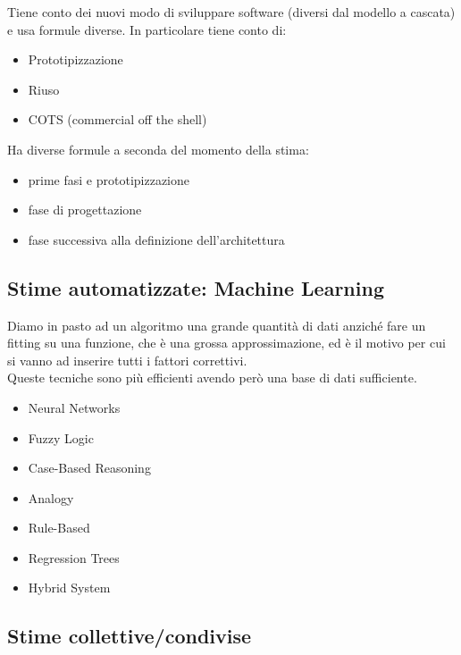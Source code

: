 Tiene conto dei nuovi modo di sviluppare software (diversi dal modello a cascata) e usa formule diverse. In particolare tiene conto di:
\begin{itemize}
    \item Prototipizzazione
    \item Riuso
    \item COTS (commercial off the shell)
\end{itemize}
Ha diverse formule a seconda del momento della stima:
\begin{itemize}
    \item prime fasi e prototipizzazione
    \item fase di progettazione
    \item fase successiva alla definizione dell'architettura
\end{itemize}

\subsection{Stime automatizzate: Machine Learning}
Diamo in pasto ad un algoritmo una grande quantità di dati anziché fare un fitting su una funzione, che è una grossa approssimazione, ed è il motivo per cui si vanno ad inserire tutti i fattori correttivi. \\
Queste tecniche sono più efficienti avendo però una base di dati sufficiente.
\begin{itemize}
    \item Neural Networks
    \item Fuzzy Logic
    \item Case-Based Reasoning
    \item Analogy
    \item Rule-Based
    \item Regression Trees
    \item Hybrid System
\end{itemize}

\subsection{Stime collettive/condivise}

